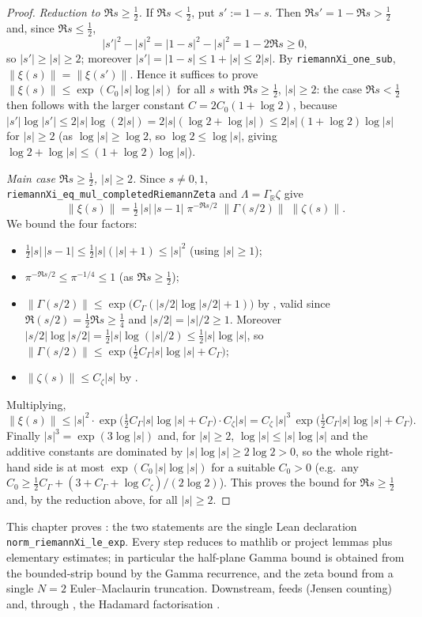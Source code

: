 \begin{proof}
\leanok
{}
\emph{Reduction to $\Re s\ge\tfrac12$.} If $\Re s<\tfrac12$, put $s':=1-s$. Then
$\Re s'=1-\Re s>\tfrac12$ and, since $\Re s\le\tfrac12$,
\[
  |s'|^2-|s|^2=|1-s|^2-|s|^2=1-2\Re s\ge0,
\]
so $|s'|\ge|s|\ge2$; moreover $|s'|=|1-s|\le1+|s|\le2|s|$. By
\texttt{riemannXi\_one\_sub}, $\|\xi(s)\|=\|\xi(s')\|$. Hence it suffices to prove
$\|\xi(s)\|\le\exp(C_0\,|s|\log|s|)$ for all $s$ with $\Re s\ge\tfrac12$, $|s|\ge2$: the
case $\Re s<\tfrac12$ then follows with the larger constant $C=2C_0(1+\log2)$, because
$|s'|\log|s'|\le2|s|\log(2|s|)=2|s|(\log2+\log|s|)\le2|s|(1+\log2)\log|s|$ for $|s|\ge2$
(as $\log|s|\ge\log2$, so $\log2\le\log|s|$, giving $\log2+\log|s|\le(1+\log2)\log|s|$).

\emph{Main case $\Re s\ge\tfrac12$, $|s|\ge2$.} Since $s\neq0,1$,
\texttt{riemannXi\_eq\_mul\_completedRiemannZeta} and $\Lambda=\Gamma_{\mathbb R}\zeta$
give
\[
  \|\xi(s)\|=\tfrac12\,|s|\,|s-1|\;\pi^{-\Re s/2}\;\|\Gamma(s/2)\|\;\|\zeta(s)\|.
\]
We bound the four factors:
\begin{itemize}
\item $\tfrac12|s|\,|s-1|\le\tfrac12|s|(|s|+1)\le|s|^2$ (using $|s|\ge1$);
\item $\pi^{-\Re s/2}\le\pi^{-1/4}\le1$ (as $\Re s\ge\tfrac12$);
\item $\|\Gamma(s/2)\|\le\exp\bigl(C_\Gamma(|s/2|\log|s/2|+1)\bigr)$ by
  , valid since $\Re(s/2)=\tfrac12\Re s\ge\tfrac14$ and
  $|s/2|=|s|/2\ge1$. Moreover $|s/2|\log|s/2|=\tfrac12|s|\log(|s|/2)\le\tfrac12|s|\log|s|$,
  so $\|\Gamma(s/2)\|\le\exp\bigl(\tfrac12 C_\Gamma|s|\log|s|+C_\Gamma\bigr)$;
\item $\|\zeta(s)\|\le C_\zeta|s|$ by .
\end{itemize}
Multiplying,
\[
  \|\xi(s)\|\le|s|^2\cdot\exp\bigl(\tfrac12 C_\Gamma|s|\log|s|+C_\Gamma\bigr)\cdot C_\zeta|s|
   =C_\zeta\,|s|^{3}\,\exp\bigl(\tfrac12 C_\Gamma|s|\log|s|+C_\Gamma\bigr).
\]
Finally $|s|^3=\exp(3\log|s|)$ and, for $|s|\ge2$, $\log|s|\le|s|\log|s|$ and the additive
constants are dominated by $|s|\log|s|\ge2\log2>0$, so the whole right-hand side is at
most $\exp(C_0\,|s|\log|s|)$ for a suitable $C_0>0$ (e.g.\ any
$C_0\ge\tfrac12 C_\Gamma+ (3+C_\Gamma+\log C_\zeta)/(2\log2)$). This proves the bound for
$\Re s\ge\tfrac12$ and, by the reduction above, for all $|s|\ge2$.
\end{proof}

\begin{remark}
This chapter proves : the two statements are the single Lean
declaration \texttt{norm\_riemannXi\_le\_exp}. Every step reduces to mathlib or project
lemmas plus elementary estimates; in particular the half-plane
Gamma bound  is obtained from the bounded-strip bound
 by the Gamma recurrence, and the zeta bound  from a single $N=2$ Euler--Maclaurin
truncation. Downstream,  feeds  (Jensen
counting) and, through , the Hadamard factorisation
.
\end{remark}
